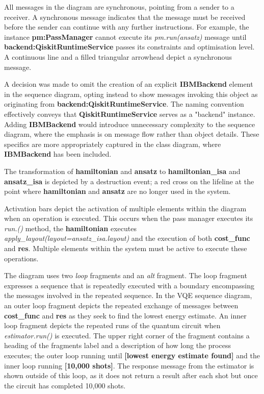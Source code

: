 \documentclass{article}
\begin{document}
All messages in the diagram are synchronous, pointing from a sender to a receiver. A synchronous message indicates that the message must be received before the sender can continue with any further instructions\cite{Seidl_Scholz_Huemer_Kappel_Duffy_2014}. For example, the instance \textbf{pm:PassManager} cannot execute its \textit{pm.run(ansatz)} message until \textbf{backend:QiskitRuntimeService} passes its constraints and optimisation level. A continuous line and a filled triangular arrowhead depict a synchronous message.

A decision was made to omit the creation of an explicit \textbf{IBMBackend} element in the sequence diagram, opting instead to show messages invoking this object as originating from \textbf{backend:QiskitRuntimeService}.
The naming convention effectively conveys that \textbf{QiskitRuntimeService} serves as a "backend" instance. Adding \textbf{IBMBackend} would introduce unnecessary complexity to the sequence diagram, where the emphasis is on message flow rather than object details. These specifics are more appropriately captured in the class diagram, where \textbf{IBMBackend} has been included.

The transformation of \textbf{hamiltonian} and \textbf{ansatz} to \textbf{hamiltonian\_isa} and \textbf{ansatz\_isa} is depicted by a destruction event; a red cross on the lifeline at the point where \textbf{hamiltonian} and \textbf{ansatz} are no longer used in the system.

Activation bars depict the activation of multiple elements within the diagram when an operation is executed\cite{creatley}. This occurs when the pass manager executes its \textit{run.()} method, the  \textbf{hamiltonian} executes \textit{apply\_layout(layout=ansatz\_isa.layout)} and the execution of both \textbf{cost\_func} and \textbf{res}. Multiple elements within the system must be active to execute these operations.

The diagram uses two \textit{loop} fragments and an \textit{alt} fragment. The loop fragment expresses a sequence that is repeatedly executed\cite{Seidl_Scholz_Huemer_Kappel_Duffy_2014} with a boundary encompassing the messages involved in the repeated sequence. In the VQE sequence diagram, an outer loop fragment depicts the repeated exchange of messages between \textbf{cost\_func} and \textbf{res} as they seek to find the lowest energy estimate. An inner loop fragment depicts the repeated runs of the quantum circuit when \textit{estimator.run()} is executed. The upper right corner of the fragment contains a heading of the fragments label and a description of how long the process executes; the outer loop running until \textbf{[lowest energy estimate found]} and the inner loop running \textbf{[10,000 shots]}. The response message from the estimator is shown outside of this loop, as it does not return a result after each shot but once the circuit has completed 10,000 shots. 
\end{document}
